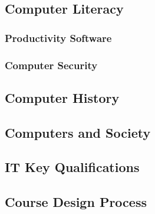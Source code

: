 \subsection{Computer Literacy}

\subsubsection{Productivity Software}

\subsubsection{Computer Security}

\subsection{Computer History}

\subsection{Computers and Society}

\subsection{IT Key Qualifications}

\subsection{Course Design Process}